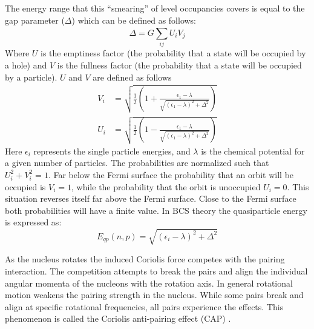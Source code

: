 The energy range that this ``smearing'' of level occupancies covers is equal to the gap parameter ($\Delta$) which can be defined as follows:
\begin{equation}
\label{eqn:chp2-pairing-gap-param}
\Delta = G\sum\limits_{ij}^{}U_iV_j
\end{equation}
Where $U$ is the emptiness factor (the probability that a state will be occupied by a hole) and $V$ is the fullness factor (the probability that a state will be occupied by a particle). $U$ and $V$ are defined as follows
\begin{align}
\label{eqn:chp2-pairing-gap-param-defs}
V_i &= \sqrt{\frac{1}{2}\left(1+\frac{\epsilon_1-\lambda}{\sqrt{(\epsilon_1-\lambda)^2+\Delta^2}}\right)}\\
U_i &= \sqrt{\frac{1}{2}\left(1-\frac{\epsilon_1-\lambda}{\sqrt{(\epsilon_1-\lambda)^2+\Delta^2}}\right)}
\end{align}
Here $\epsilon_i$ represents the single particle energies, and $\lambda$ is the chemical potential for a given number of particles. The probabilities are normalized such that $U_i^2+V_i^2=1$. Far below the Fermi surface the probability that an orbit will be occupied is $V_i=1$, while the probability that the orbit is unoccupied $U_i=0$. This situation reverses itself far above the Fermi surface. Close to the Fermi surface both probabilities will have a finite value. In BCS theory \cite{bcsTheory} the quasiparticle energy is expressed as:
\begin{equation}
\label{eqn:chp2-pairing-qp-en}
E_{qp}(n,p)=\sqrt{(\epsilon_i-\lambda)^2+\Delta^2}
\end{equation}

As the nucleus rotates the induced Coriolis force competes with the pairing interaction. The competition attempts to break the pairs and align the individual angular momenta of the nucleons with the rotation axis. In general rotational motion weakens the pairing strength in the nucleus. While some pairs break and align at specific rotational frequencies, all pairs experience the effects. This phenomenon is called the Coriolis anti-pairing effect (CAP) \cite{bohrMottelsonRotationWeakensPairing}.

